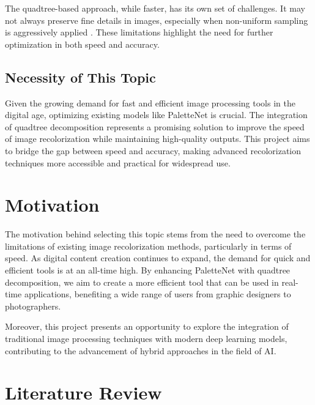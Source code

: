 \documentclass[12pt,a4paper]{report}
\begin{document}
The quadtree-based approach, while faster, has its own set of challenges. It may not always preserve fine details in images, especially when non-uniform sampling is aggressively applied \cite{quadtree2024}. These limitations highlight the need for further optimization in both speed and accuracy.

\subsection*{Necessity of This Topic}
Given the growing demand for fast and efficient image processing tools in the digital age, optimizing existing models like PaletteNet is crucial. The integration of quadtree decomposition represents a promising solution to improve the speed of image recolorization while maintaining high-quality outputs. This project aims to bridge the gap between speed and accuracy, making advanced recolorization techniques more accessible and practical for widespread use.

\section*{Motivation}

The motivation behind selecting this topic stems from the need to overcome the limitations of existing image recolorization methods, particularly in terms of speed. As digital content creation continues to expand, the demand for quick and efficient tools is at an all-time high. By enhancing PaletteNet with quadtree decomposition, we aim to create a more efficient tool that can be used in real-time applications, benefiting a wide range of users from graphic designers to photographers.

Moreover, this project presents an opportunity to explore the integration of traditional image processing techniques with modern deep learning models, contributing to the advancement of hybrid approaches in the field of AI.

\section*{Literature Review}
\end{document}
